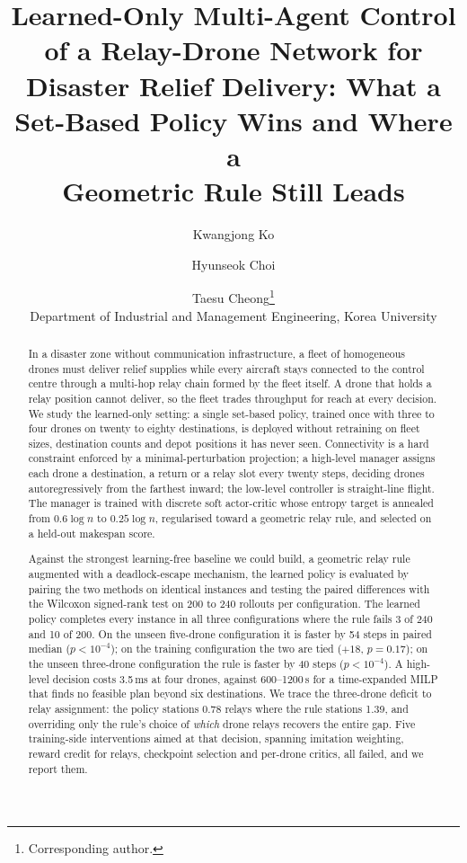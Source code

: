 \documentclass[12pt]{article}
\title{Learned-Only Multi-Agent Control of a Relay-Drone Network for\\
Disaster Relief Delivery: What a Set-Based Policy Wins and Where a\\
Geometric Rule Still Leads}
\author{Kwangjong Ko \and Hyunseok Choi \and Taesu Cheong\thanks{Corresponding author.}\\
Department of Industrial and Management Engineering, Korea University}
\date{}
\begin{document}
\maketitle

\begin{abstract}
In a disaster zone without communication infrastructure, a fleet of homogeneous drones must
deliver relief supplies while every aircraft stays connected to the control centre through a
multi-hop relay chain formed by the fleet itself. A drone that holds a relay position cannot
deliver, so the fleet trades throughput for reach at every decision. We study the learned-only
setting: a single set-based policy, trained once with three to four drones on twenty to eighty
destinations, is deployed without retraining on fleet sizes, destination counts and depot
positions it has never seen. Connectivity is a hard constraint enforced by a minimal-perturbation
projection; a high-level manager assigns each drone a destination, a return or a relay slot every
twenty steps, deciding drones autoregressively from the farthest inward; the low-level controller
is straight-line flight. The manager is trained with discrete soft actor-critic whose entropy
target is annealed from $0.6\log n$ to $0.25\log n$, regularised toward a geometric relay rule,
and selected on a held-out makespan score.

Against the strongest learning-free baseline we could build, a geometric relay rule augmented
with a deadlock-escape mechanism, the learned policy is evaluated by pairing the two methods on
identical instances and testing the paired differences with the Wilcoxon signed-rank test on
200 to 240 rollouts per configuration. The learned policy completes every instance in all three
configurations where the rule fails 3 of 240 and 10 of 200. On the unseen five-drone
configuration it is faster by 54 steps in paired median ($p < 10^{-4}$); on the training
configuration the two are tied ($+18$, $p = 0.17$); on the unseen three-drone configuration the
rule is faster by 40 steps ($p < 10^{-4}$). A high-level decision costs 3.5\,ms at four drones,
against 600--1200\,s for a time-expanded MILP that finds no feasible plan beyond six destinations.
We trace the three-drone deficit to relay assignment: the policy stations 0.78 relays where the
rule stations 1.39, and overriding only the rule's choice of \emph{which} drone relays recovers
the entire gap. Five training-side interventions aimed at that decision, spanning imitation
weighting, reward credit for relays, checkpoint selection and per-drone critics, all failed, and
we report them.
\end{abstract}
\end{document}
